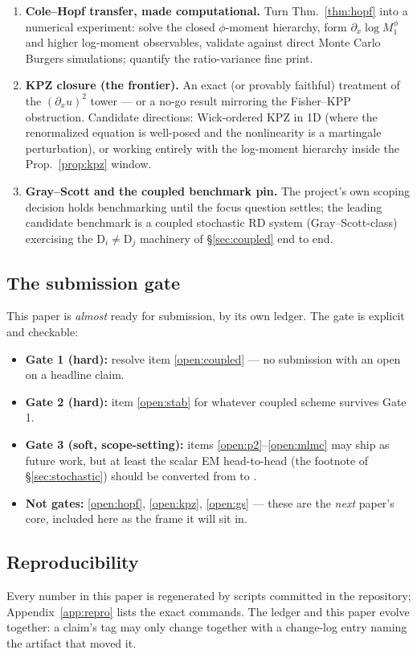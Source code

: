 \begin{enumerate}
\item \textbf{Cole--Hopf transfer, made computational.}\label{open:hopf}
Turn Thm.~\ref{thm:hopf} into a numerical experiment: solve the closed
$\phi$-moment hierarchy, form $\partial_x\log M_1^\phi$ and higher
log-moment observables, validate against direct Monte Carlo Burgers
simulations; quantify the ratio-variance fine print.

\item \textbf{KPZ closure (the frontier).}\label{open:kpz}
An exact (or provably faithful) treatment of the $(\partial_xu)^2$ tower ---
or a no-go result mirroring the Fisher--KPP obstruction. Candidate directions:
Wick-ordered KPZ in 1D (where the renormalized equation is well-posed and the
nonlinearity is a martingale perturbation), or working entirely with the
log-moment hierarchy inside the Prop.~\ref{prop:kpz} window.

\item \textbf{Gray--Scott and the coupled benchmark pin.}\label{open:gs}
The project's own scoping decision holds benchmarking until the focus question
settles; the leading candidate benchmark is a coupled stochastic RD system
(Gray--Scott-class) exercising the D$_i\ne$D$_j$ machinery of
\S\ref{sec:coupled} end to end.
\end{enumerate}

\subsection{The submission gate}

This paper is \emph{almost} ready for submission, by its own ledger. The gate
is explicit and checkable:

\begin{itemize}
\item \textbf{Gate 1 (hard):} resolve item \ref{open:coupled} --- no submission
with an open \tagC on a headline claim.
\item \textbf{Gate 2 (hard):} item \ref{open:stab} for whatever coupled scheme
survives Gate 1.
\item \textbf{Gate 3 (soft, scope-setting):} items \ref{open:p2}--\ref{open:mlmc}
may ship as future work, but at least the scalar EM head-to-head (the footnote
of \S\ref{sec:stochastic}) should be converted from \tagS to \tagV.
\item \textbf{Not gates:} \ref{open:hopf}, \ref{open:kpz}, \ref{open:gs} ---
these are the \emph{next} paper's core, included here as the frame it will sit
in.
\end{itemize}

\subsection{Reproducibility}

Every \tagV number in this paper is regenerated by scripts committed in the
repository; Appendix~\ref{app:repro} lists the exact commands. The ledger and
this paper evolve together: a claim's tag may only change together with a
change-log entry naming the artifact that moved it.
